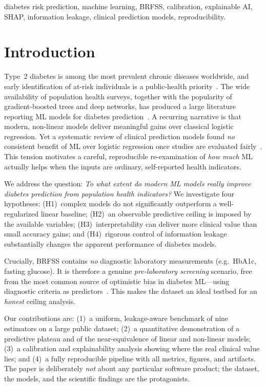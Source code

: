 \documentclass[conference]{IEEEtran}
\begin{document}
\begin{IEEEkeywords}
diabetes risk prediction, machine learning, BRFSS, calibration, explainable AI,
SHAP, information leakage, clinical prediction models, reproducibility.
\end{IEEEkeywords}

\section{Introduction}
Type~2 diabetes is among the most prevalent chronic diseases worldwide, and early
identification of at-risk individuals is a public-health priority~\cite{idf2021atlas,
ada2021classification}. The wide availability of population health surveys, together
with the popularity of gradient-boosted trees and deep networks, has produced a large
literature reporting ML models for diabetes
prediction~\cite{xie2019building,dinh2019data,tigga2020prediction,rashid2020diabetes}.
A recurring narrative is that modern, non-linear models deliver meaningful gains over
classical logistic regression. Yet a systematic review of clinical prediction models
found \emph{no} consistent benefit of ML over logistic regression once studies are
evaluated fairly~\cite{christodoulou2019systematic}. This tension motivates a careful,
reproducible re-examination of \emph{how much} ML actually helps when the inputs are
ordinary, self-reported health indicators.

We address the question: \emph{To what extent do modern ML models really improve
diabetes prediction from population health indicators?} We investigate four
hypotheses: (H1)~complex models do not significantly outperform a well-regularized
linear baseline; (H2)~an observable predictive ceiling is imposed by the available
variables; (H3)~interpretability can deliver more clinical value than small accuracy
gains; and (H4)~rigorous control of information leakage substantially changes the
apparent performance of diabetes models.

Crucially, BRFSS contains \emph{no} diagnostic laboratory measurements (e.g.\ HbA1c,
fasting glucose). It is therefore a genuine \emph{pre-laboratory screening} scenario,
free from the most common source of optimistic bias in diabetes ML---using diagnostic
criteria as predictors~\cite{kaufman2012leakage,kapoor2023leakage}. This makes the
dataset an ideal testbed for an \emph{honest} ceiling analysis.

Our contributions are: (1)~a uniform, leakage-aware benchmark of nine estimators on a
large public dataset; (2)~a quantitative demonstration of a predictive plateau and of
the near-equivalence of linear and non-linear models; (3)~a calibration and
explainability analysis showing where the real clinical value lies; and (4)~a
fully reproducible pipeline with all metrics, figures, and artifacts. The paper is
deliberately \emph{not} about any particular software product; the dataset, the
models, and the scientific findings are the protagonists.
\end{document}
